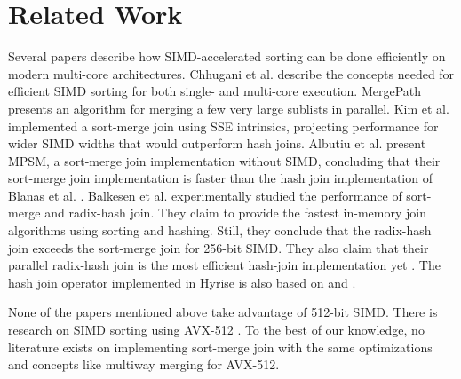 \section{Related Work}
\label{sec:related-work}

Several papers describe how SIMD-accelerated sorting can be done efficiently on modern multi-core architectures.
Chhugani et al. \cite{10.14778/1454159.1454171} describe the concepts 
needed for efficient SIMD sorting for both single- and multi-core execution. MergePath \cite{MergePath}
presents an algorithm for merging a few very large sublists in parallel.
Kim et al. \cite{10.14778/1687553.1687564} implemented a sort-merge join using SSE intrinsics,
projecting performance for wider SIMD widths that would outperform hash joins. Albutiu 
et al. \cite{MPSM} present MPSM, a sort-merge join implementation 
without SIMD, concluding that their sort-merge join
implementation is faster than the hash join implementation of Blanas et al. \cite{10.1145/1989323.1989328}. 
Balkesen et al. \cite{Balkesen} experimentally studied the performance of sort-merge and radix-hash join.
They claim to provide the fastest in-memory join algorithms using sorting and hashing.
Still, they conclude that the radix-hash join exceeds the sort-merge join for 256-bit
SIMD. They also claim that their parallel radix-hash join is the most efficient hash-join
implementation yet \cite{6544839}. The hash join operator
implemented in Hyrise is also based on \cite{6544839} and \cite{Balkesen}. 

None of the papers mentioned above take advantage of 512-bit SIMD. 
There is research on SIMD sorting using AVX-512 \cite{Watkins, 8855628}. To the best of our knowledge,
no literature exists on implementing sort-merge join with the same optimizations and concepts like
multiway merging for AVX-512. 

